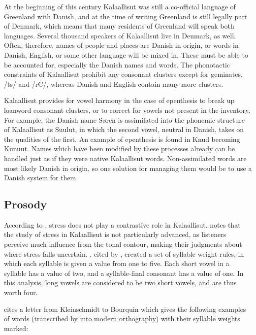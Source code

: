 \documentclass[12pt]{article}
\begin{document}
	At the beginning of this century Kalaallisut was still a co-official language of Greenland with Danish, and at the time of writing Greenland is still legally part of Denmark, which means that many residents of Greenland will speak both languages. Several thousand speakers of Kalaallisut live in Denmark, as well. Often, therefore, names of people and places are Danish in origin, or words in Danish, English, or some other language will be mixed in. These must be able to be accounted for, especially the Danish names and words. The phonotactic constraints of Kalaallisut prohibit any consonant clusters except for geminates, /ts/ and /rC/, whereas Danish and English contain many more clusters. \par

	Kalaallisut provides for vowel harmony in the case of epenthesis to break up loanword consonant clusters, or to correct for vowels not present in the inventory. For example, the Danish name S\o ren is assimilated into the phonemic structure of Kalaallisut as Suulut, in which the second vowel, neutral in Danish, takes on the qualities of the first. An example of epenthesis is found in Knud becoming Kunuut. Names which have been modified by these processes already can be handled just as if they were native Kalaallisut words. Non-assimilated words are most likely Danish in origin, so one solution for managing them would be to use a Danish system for them. \par

	\subsection{Prosody}

	According to \citet{grammar}, stress does not play a contrastive role in Kalaallisut. \citet{rischel} notes that the study of stress in Kalaallisut is not particularly advanced, as listeners perceive much influence from the tonal contour, making their judgments about where stress falls uncertain. \citet{kleinschmidt}, cited by \citet{rischel}, created a set of syllable weight rules, in which each syllable is given a value from one to five. Each short vowel in a syllable has a value of two, and a syllable-final consonant has a value of one. In this analysis, long vowels are considered to be two short vowels, and are thus worth four. \par

	\citet{kleinletter} cites a letter from Kleinschmidt to Bourquin which gives the following examples of words (transcribed by \citet{rischel} into modern orthography) with their syllable weights marked:
\end{document}
